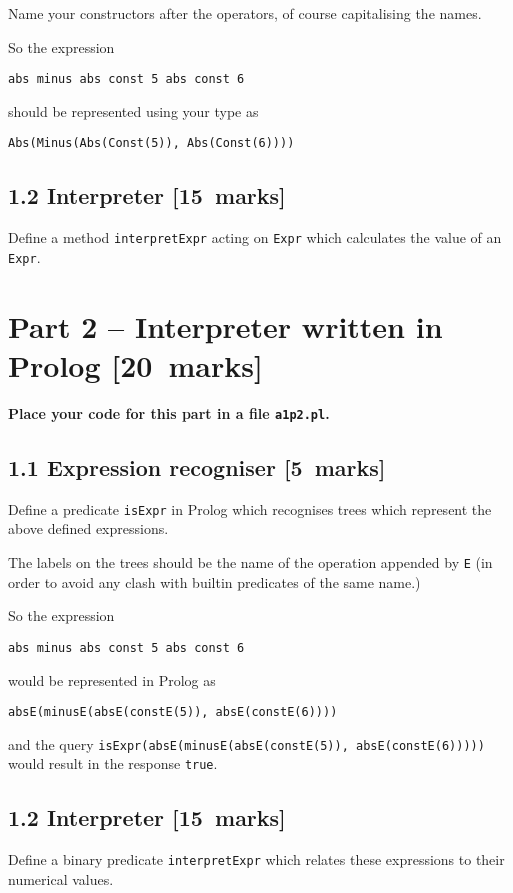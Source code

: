 \documentclass[11pt]{article}
\begin{document}
Name your constructors after the operators,
of course capitalising the names.

So the expression
\begin{verbatim}
abs minus abs const 5 abs const 6
\end{verbatim}
should be represented using your type as
\begin{verbatim}
Abs(Minus(Abs(Const(5)), Abs(Const(6))))
\end{verbatim}

\subsection*{1.2 Interpreter    [15 marks]}
\label{sec:org512eebb}
Define a method \texttt{interpretExpr} acting on \texttt{Expr} which
calculates the value of an \texttt{Expr}.

\section*{Part 2 – Interpreter written in Prolog [20 marks]}
\label{sec:org456a780}
\begin{center}
\textbf{Place your code for this part in a file \texttt{a1p2.pl}.}
\end{center}

\subsection*{1.1 Expression recogniser [5 marks]}
\label{sec:org32c5386}
Define a predicate \texttt{isExpr} in Prolog which recognises
trees which represent the above defined expressions.

The labels on the trees should be the name of the operation
appended by \texttt{E} (in order to avoid any clash with builtin predicates
of the same name.)

So the expression
\begin{verbatim}
abs minus abs const 5 abs const 6
\end{verbatim}
would be represented in Prolog as
\begin{verbatim}
absE(minusE(absE(constE(5)), absE(constE(6))))
\end{verbatim}
and the query \texttt{isExpr(absE(minusE(absE(constE(5)), absE(constE(6)))))} would
result in the response \texttt{true}.

\subsection*{1.2 Interpreter           [15 marks]}
\label{sec:org0770196}
Define a binary predicate \texttt{interpretExpr} which
relates these expressions to their numerical values.
\end{document}

